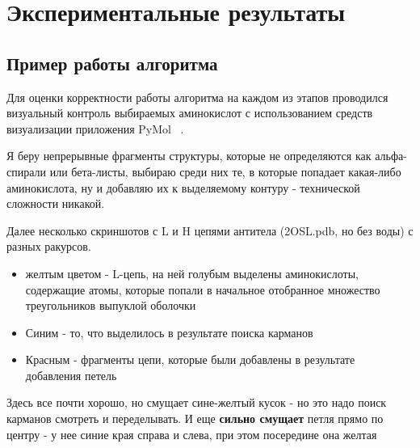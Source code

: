\chapter{Экспериментальные результаты}
\section{Пример работы алгоритма}
Для оценки корректности работы алгоритма на каждом из этапов проводился визуальный контроль выбираемых аминокислот с использованием средств визуализации приложения PyMol ~\cite{pymol}.

Я беру непрерывные фрагменты структуры, которые не определяются как альфа-спирали или бета-листы, выбираю среди них те, в которые попадает какая-либо аминокислота, ну и добавляю их к выделяемому контуру - технической сложности никакой.

Далее несколько скриншотов с L и H цепями антитела (2OSL.pdb, но без воды) с разных ракурсов.
\begin{itemize}

\item желтым цветом - L-цепь, на ней голубым выделены аминокислоты, содержащие атомы, которые попали в начальное отобранное множество треугольников выпуклой оболочки

\item Синим - то, что выделилось в результате поиска карманов

\item Красным - фрагменты цепи, которые были добавлены в результате добавления петель

\end{itemize}

Здесь все почти хорошо, но смущает сине-желтый кусок - но это надо поиск карманов смотреть и переделывать. И еще \textbf{сильно смущает} петля прямо по центру - у нее синие края справа и слева, при этом посередине она желтая


